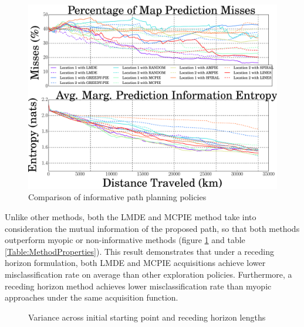 			\begin{figure}[!htbp]
			\centering
				\includegraphics[width = 0.8\linewidth]{Figures/compare_methods.eps}
			\caption{Comparison of informative path planning policies}
			\label{Figure:CompareMethods}
			\end{figure}
				
			Unlike other methods, both the LMDE and MCPIE method take into consideration the mutual information of the proposed path, so that both methods outperform myopic or non-informative methods (figure \ref{Figure:CompareMethods} and table \ref{Table:MethodProperties}). This result demonstrates that under a receding horizon formulation, both LMDE and MCPIE acquisitions achieve lower misclassification rate on average than other exploration policies. Furthermore, a receding horizon method achieves lower misclassification rate than myopic approaches under the same acquisition function.

			\begin{figure}[!htbp]
			\centering
			\caption{Variance across initial starting point and receding horizon lengths}
			\label{Figure:VarianceSimulation}
			\end{figure}	
				
